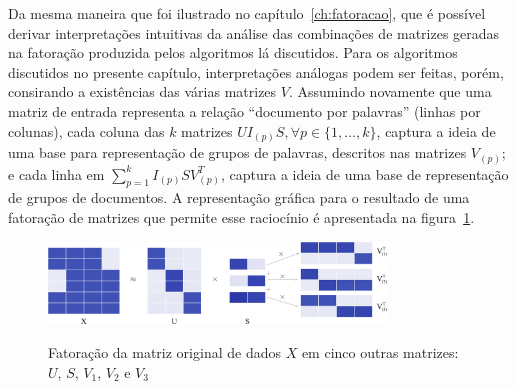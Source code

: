 \documentclass[
    12pt,                %
    oneside,            %
    a4paper,            %
    english,            %
    brazil                %
    ]{abntex2ppgsi}
\begin{document}
Da mesma maneira que foi ilustrado no capítulo~\ref{ch:fatoracao}, que é possível derivar interpretações intuitivas da análise das combinações de matrizes geradas na fatoração produzida pelos algoritmos lá discutidos.
Para os algoritmos discutidos no presente capítulo, interpretações análogas podem ser feitas, porém, consirando a existências das várias matrizes $V$.
Assumindo novamente que uma matriz de entrada representa a relação ``documento por palavras'' (linhas por colunas), cada coluna das $k$ matrizes $U I_{(p)} S, \forall p \in \{1, \dots, k\}$, captura a ideia de uma base para representação de grupos de palavras, descritos nas matrizes $V_{(p)}$; e cada linha em $\sum_{p=1}^k I_{(p)} S V_{(p)}^T$, captura a ideia de uma base de representação de grupos de documentos.
A representação gráfica para o resultado de uma fatoração de matrizes que permite esse raciocínio é apresentada na figura~\ref{fig:factorizationXUSV1tok}.

\begin{figure}[H]
\centering
\caption{
Fatoração da matriz original de dados $X$ em cinco outras matrizes: $U$, $S$, $V_1$, $V_2$ e $V_3$}
\includegraphics[width=0.8\textwidth]{img/factorizationXUSV1tok.png}
\label{fig:factorizationXUSV1tok}
\end{figure}
\end{document}
